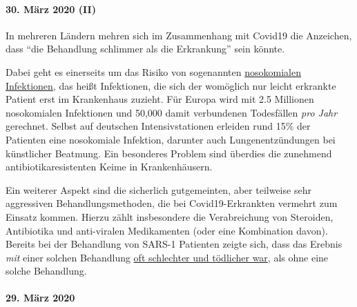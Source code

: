 \hypertarget{30-muxe4rz-2020-ii}{%
\paragraph{30. März 2020 (II)}\label{30-muxe4rz-2020-ii}}

In mehreren Ländern mehren sich im Zusammenhang mit Covid19 die
Anzeichen, dass ``die Behandlung schlimmer als die Erkrankung'' sein
könnte.

Dabei geht es einerseits um das Risiko von sogenannten
\href{https://de.wikipedia.org/wiki/Nosokomiale_Infektion}{nosokomialen
Infektionen}, das heißt Infektionen, die sich der womöglich nur leicht
erkrankte Patient erst im Krankenhaus zuzieht. Für Europa wird mit 2.5
Millionen nosokomialen Infektionen und 50,000 damit verbundenen
Todesfällen \emph{pro Jahr} gerechnet. Selbst auf deutschen
Intensivstationen erleiden rund 15\% der Patienten eine nosokomiale
Infektion, darunter auch Lungenentzündungen bei künstlicher Beatmung.
Ein beson­deres Problem sind überdies die zunehmend
antibiotikaresistenten Keime in Krankenhäusern.

Ein weiterer Aspekt sind die sicherlich gutgemeinten, aber teilweise
sehr aggressiven Behandlungs­methoden, die bei Covid19-Erkrankten
vermehrt zum Einsatz kommen. Hierzu zählt insbesondere die Verabreichung
von Steroiden, Antibiotika und anti-viralen Medikamenten (oder eine
Kombination davon). Bereits bei der Behandlung von SARS-1 Patienten
zeigte sich, dass das Erebnis \emph{mit} einer solchen Behandlung
\href{https://www.sciencedaily.com/releases/2020/02/200206110703.htm}{oft
schlechter und tödlicher war}, als ohne eine solche Behandlung.

\hypertarget{29-muxe4rz-2020}{%
\paragraph{29. März 2020}\label{29-muxe4rz-2020}}

